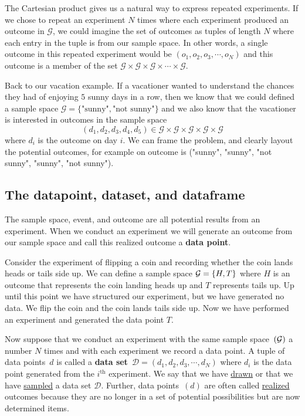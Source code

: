 The Cartesian product gives us a natural way to express repeated experiments.
If we chose to repeat an experiment $N$ times where each experiment produced an outcome in $\mathcal{G}$, we could imagine the set of outcomes as tuples of length $N$ where each entry in the tuple is from our sample space.
In other words, a single outcome in this repeated experiment would be $(o_{1},o_{2},o_{3},\cdots,o_{N})$ and this outcome is a member of the set $\mathcal{G} \times \mathcal{G} \times \mathcal{G} \times \cdots \times \mathcal{G}$.

Back to our vacation example. 
If a vacationer wanted to understand the chances they had of enjoying $5$ sunny days in a row, then we know that we could defined a sample space $\mathcal{G} = \{\text{"sunny"},\text{"not sunny"}\}$ and we also know that the vacationer is interested in outcomes in the sample space 
\begin{equation}
    (d_{1},d_{2},d_{3},d_{4},d_{5}) \in \mathcal{G} \times \mathcal{G}\times \mathcal{G}\times \mathcal{G}\times \mathcal{G} 
\end{equation}
where $d_{i}$ is the outcome on day $i$.
We can frame the problem, and clearly layout the potential outcomes, for example on outcome is ("sunny", "sunny", "not sunny", "sunny", "not sunny").

\subsection{The datapoint, dataset, and dataframe}

The sample space, event, and outcome are all potential results from an experiment. 
When we conduct an experiment we will generate an outcome from our sample space and call this realized outcome a \textbf{data point}. 

\ex Consider the experiment of flipping a coin and recording whether the coin lands heads or tails side up.
We can define a sample space $\mathcal{G} = \{H,T\}$ where $H$ is an outcome that represents the coin landing heads up and $T$ represents tails up. Up until this point we have structured our experiment, but we have generated no data. We flip the coin and the coin lands tails side up. Now we have performed an experiment and generated the data point $T$.

Now suppose that we conduct an experiment with the same sample space~$(\mathcal{G})$ a number $N$ times and with each experiment we record a data point. A tuple of data points~$d$ is called a \textbf{data set}~$\mathcal{D} = (d_{1}, d_{2}, d_{3}, \cdots, d_{N})$ where $d_{i}$ is the data point generated from the $i^\text{th}$ experiment.
We say that we have \underline{drawn} or that we have \underline{sampled} a data set $\mathcal{D}$. Further, data points~$(d)$ are often called \underline{realized} outcomes because they are no longer in a set of potential possibilities but are now determined items. 

